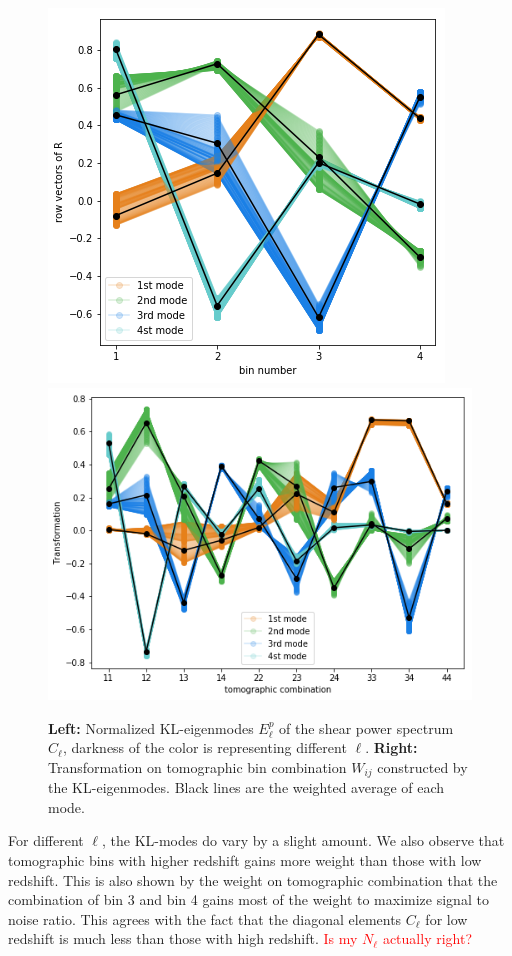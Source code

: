 \documentclass[twocolumn]{\docclass}
\begin{document}
	\begin{figure}
		\includegraphics[width=0.80\columnwidth]{epi.png}
		\includegraphics[width=1.02\columnwidth]{Wij.png}
		\caption{\textbf{Left:} Normalized KL-eigenmodes $E_\ell^p$ of the shear power spectrum $C_{\ell}$, darkness of the color is representing different $\ell$. \textbf{Right:} Transformation on tomographic bin combination $W_{ij}$ constructed by the KL-eigenmodes. Black lines are the weighted average of each mode. \label{fig:kl-mode}}
	\end{figure}
	
	For different $\ell$, the KL-modes do vary by a slight amount. We also observe that tomographic bins with higher redshift gains more weight than those with low redshift. This is also shown by the weight on tomographic combination that the combination of bin 3 and bin 4 gains most of the weight to maximize signal to noise ratio. This agrees with the fact that the diagonal elements $C_\ell$ for low redshift is much less than those with high redshift. \textcolor{red}{Is my $N_\ell$ actually right?}
	
\end{document}
